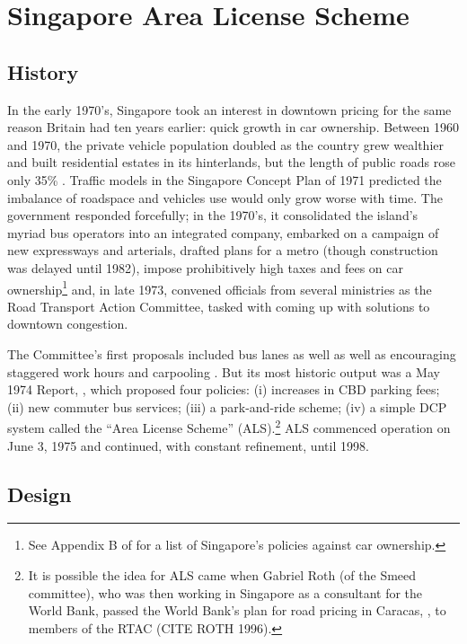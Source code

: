 \section{Singapore Area License Scheme}

\subsection{History}

In the early 1970's, Singapore took an interest in downtown pricing for the same reason Britain had ten years earlier: quick growth in car ownership. Between 1960 and 1970, the private vehicle population doubled as the country grew wealthier and built residential estates in its hinterlands, but the length of public roads rose only 35\% \citep{Santos2004}. Traffic models in the Singapore Concept Plan of 1971 predicted the imbalance of roadspace and vehicles use would only grow worse with time. The government responded forcefully; in the 1970's, it consolidated the island's myriad bus operators into an integrated company, embarked on a campaign of new expressways and arterials, drafted plans for a metro (though construction was delayed until 1982), impose prohibitively high taxes and fees on car ownership\footnote{See Appendix B of \citet{Gomez-Ibanez1994} for a list of Singapore's policies against car ownership.} and, in late 1973, convened officials from several ministries as the Road Transport Action Committee, tasked with coming up with solutions to downtown congestion. 

The Committee's first proposals included bus lanes as well as well as encouraging staggered work hours and carpooling \citep{Chin1998}. But its most historic output was a May 1974 Report, \citet{SRTAC1974}, which proposed four policies: (i) increases in CBD parking fees; (ii) new commuter bus services; (iii) a park-and-ride scheme; (iv) a simple DCP system called the ``Area License Scheme'' (ALS).\footnote{It is possible the idea for ALS came when Gabriel Roth (of the Smeed committee), who was then working in Singapore as a consultant for the World Bank, passed the World Bank's plan for road pricing in Caracas, \citet{Vorhees1973}, to members of the RTAC (CITE ROTH 1996).} ALS commenced operation on June 3, 1975 and continued, with constant refinement, until 1998.

\subsection{Design}

